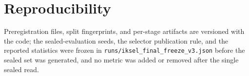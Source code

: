 \documentclass[journal]{IEEEtran}
\begin{document}
\section{Reproducibility}
Preregistration files, split fingerprints, and per-stage artifacts are
versioned with the code; the sealed-evaluation seeds, the selector
publication rule, and the reported statistics were frozen in
\texttt{runs/iksel\_final\_freeze\_v3.json} before the sealed set was
generated, and no metric was added or removed after the single sealed
read.



\end{document}
